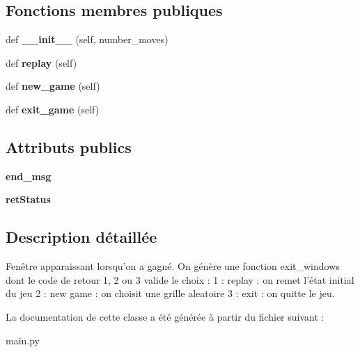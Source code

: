 \subsection*{Fonctions membres publiques}
\begin{DoxyCompactItemize}
\item 
\mbox{\label{classmain_1_1Exit__window_a9f90ad952d59d9cc730182f9e616be8d}} 
def {\bfseries \+\_\+\+\_\+init\+\_\+\+\_\+} (self, number\+\_\+moves)
\item 
\mbox{\label{classmain_1_1Exit__window_a87318378bc22e8390da9d0fb55bdc68e}} 
def {\bfseries replay} (self)
\item 
\mbox{\label{classmain_1_1Exit__window_a75336f76b626c6295d90ff9f9e58c327}} 
def {\bfseries new\+\_\+game} (self)
\item 
\mbox{\label{classmain_1_1Exit__window_aedeb6b109d4721ccf4df0dcfc4d4313e}} 
def {\bfseries exit\+\_\+game} (self)
\end{DoxyCompactItemize}
\subsection*{Attributs publics}
\begin{DoxyCompactItemize}
\item 
\mbox{\label{classmain_1_1Exit__window_a21b16b6310bf80914b483e2439f4dac3}} 
{\bfseries end\+\_\+msg}
\item 
\mbox{\label{classmain_1_1Exit__window_ab7058381e75bb04bf887e083aecc3bc3}} 
{\bfseries ret\+Status}
\end{DoxyCompactItemize}


\subsection{Description détaillée}
\begin{DoxyVerb}Fenêtre apparaissant lorsqu'on a gagné. On génère une fonction exit_windows dont le code de retour 1, 2 ou 3 valide le choix :
1 : replay : on remet l'état initial du jeu
2 : new game : on choisit une grille aleatoire
3 : exit : on quitte le jeu.
\end{DoxyVerb}
 

La documentation de cette classe a été générée à partir du fichier suivant \+:\begin{DoxyCompactItemize}
\item 
main.\+py\end{DoxyCompactItemize}
